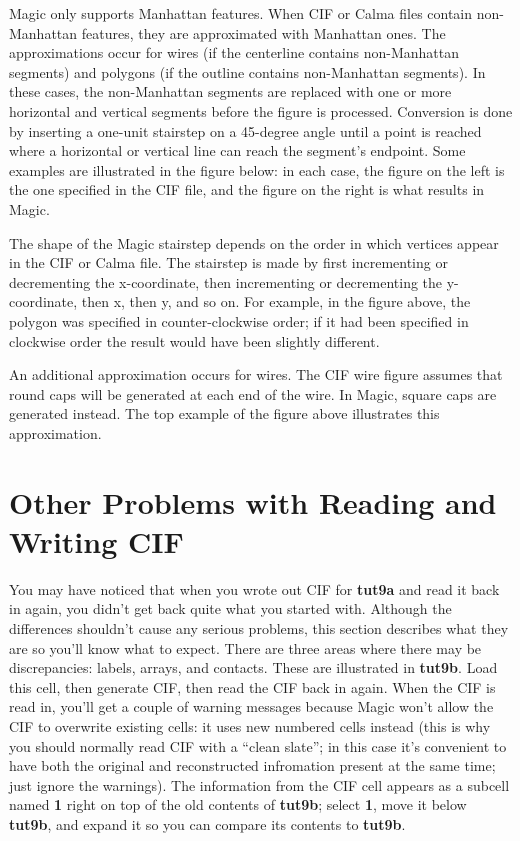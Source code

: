 \documentclass[letterpaper,twoside,12pt]{article}
\begin{document}
Magic only supports Manhattan features.  When CIF or Calma files
contain non-Manhattan features, they are approximated with
Manhattan ones.  The approximations occur for wires (if the
centerline contains non-Manhattan segments) and polygons
(if the outline contains non-Manhattan segments).  In
these cases, the non-Manhattan segments are replaced with one
or more horizontal and vertical segments before the figure is
processed.  Conversion is done by inserting a one-unit stairstep
on a 45-degree angle until a point is reached where a horizontal
or vertical line can reach the segment's endpoint.  Some
examples are illustrated in the figure below:  in each case, the
figure on the left is the one specified in the CIF file, and the
figure on the right is what results in Magic.

\begin{figure}[ht]
   \begin{center}
   \end{center}
\end{figure}

The shape of the Magic stairstep depends on the order in which
vertices appear in the CIF or Calma file.  The stairstep is made
by first incrementing or decrementing the x-coordinate, then
incrementing or decrementing the y-coordinate, then x, then y,
and so on.  For example, in the figure above, the polygon was
specified in counter-clockwise order;  if it had been specified
in clockwise order the result would have been slightly different.

An additional approximation occurs for wires.  The CIF wire figure
assumes that round caps will be generated at each end of the wire.
In Magic, square caps are generated instead.  The top example
of the figure above illustrates this approximation.


\section{Other Problems with Reading and Writing CIF}

You may have noticed that when you wrote out CIF for {\bfseries tut9a}
and read it back in again, you didn't get back quite what you
started with.  Although the differences shouldn't cause any serious
problems, this section describes what they are so you'll know what
to expect.  There are three areas where there may be discrepancies:
labels, arrays, and contacts.  These are illustrated in {\bfseries tut9b}.
Load this cell, then generate CIF, then read the CIF
back in again.  When the CIF is read in, you'll get a couple of
warning messages because Magic won't allow the CIF to overwrite
existing cells:  it uses new numbered cells instead (this is
why you should normally read CIF with a ``clean slate'';  in
this case it's convenient to have both the original and
reconstructed infromation present at the same time;  just
ignore the warnings). The information
from the CIF cell appears as a subcell named {\bfseries 1} right on
top of the old contents of {\bfseries tut9b};  select {\bfseries 1},
move it below {\bfseries tut9b}, and expand it so you can compare
its contents to {\bfseries tut9b}.
\end{document}
